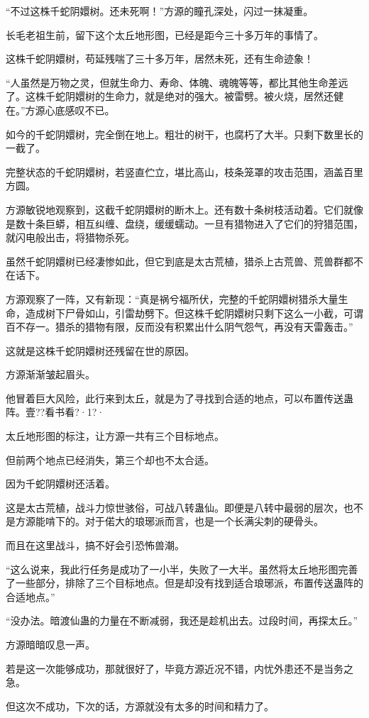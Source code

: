 \begin{this_body}
“不过这株千蛇阴嬛树。还未死啊！”方源的瞳孔深处，闪过一抹凝重。

长毛老祖生前，留下这个太丘地形图，已经是距今三十多万年的事情了。

这株千蛇阴嬛树，苟延残喘了三十多万年，居然未死，还有生命迹象！

“人虽然是万物之灵，但就生命力、寿命、体魄、魂魄等等，都比其他生命差远了。这株千蛇阴嬛树的生命力，就是绝对的强大。被雷劈。被火烧，居然还健在。”方源心底感叹不已。

如今的千蛇阴嬛树，完全倒在地上。粗壮的树干，也腐朽了大半。只剩下数里长的一截了。

完整状态的千蛇阴嬛树，若竖直伫立，堪比高山，枝条笼罩的攻击范围，涵盖百里方圆。

方源敏锐地观察到，这截千蛇阴嬛树的断木上。还有数十条树枝活动着。它们就像是数十条巨蟒，相互纠缠、盘绕，缓缓蠕动。一旦有猎物进入了它们的狩猎范围，就闪电般出击，将猎物杀死。

虽然千蛇阴嬛树已经凄惨如此，但它到底是太古荒植，猎杀上古荒兽、荒兽群都不在话下。

方源观察了一阵，又有新现：“真是祸兮福所伏，完整的千蛇阴嬛树猎杀大量生命，造成树下尸骨如山，引雷劫劈下。但这株千蛇阴嬛树只剩下这么一小截，可谓百不存一。猎杀的猎物有限，反而没有积累出什么阴气怨气，再没有天雷轰击。”

这就是这株千蛇阴嬛树还残留在世的原因。

方源渐渐皱起眉头。

他冒着巨大风险，此行来到太丘，就是为了寻找到合适的地点，可以布置传送蛊阵。壹??看书看?·1?·

太丘地形图的标注，让方源一共有三个目标地点。

但前两个地点已经消失，第三个却也不太合适。

因为千蛇阴嬛树还活着。

这是太古荒植，战斗力惊世骇俗，可战八转蛊仙。即便是八转中最弱的层次，也不是方源能啃下的。对于偌大的琅琊派而言，也是一个长满尖刺的硬骨头。

而且在这里战斗，搞不好会引恐怖兽潮。

“这么说来，我此行任务是成功了一小半，失败了一大半。虽然将太丘地形图完善了一些部分，排除了三个目标地点。但是却没有找到适合琅琊派，布置传送蛊阵的合适地点。”

“没办法。暗渡仙蛊的力量在不断减弱，我还是趁机出去。过段时间，再探太丘。”

方源暗暗叹息一声。

若是这一次能够成功，那就很好了，毕竟方源近况不错，内忧外患还不是当务之急。

但这次不成功，下次的话，方源就没有太多的时间和精力了。


\end{this_body}

